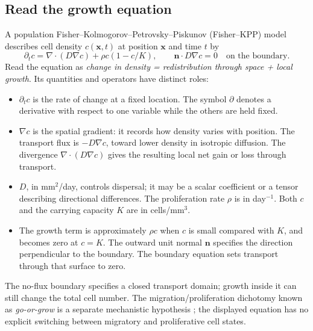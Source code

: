 \documentclass[11pt,a4paper]{article}
\begin{document}
\subsection{Read the growth equation}
A population Fisher--Kolmogorov--Petrovsky--Piskunov (Fisher--KPP) model describes cell density $c(\mathbf{x},t)$ at position $\mathbf{x}$ and time $t$ by
\begin{equation}
\partial_t c=\nabla\!\cdot(D\nabla c)+\rho c(1-c/K),
\qquad \mathbf{n}\!\cdot D\nabla c=0\quad\text{on the boundary}.
\end{equation}
Read the equation as \emph{change in density = redistribution through space + local growth}. Its quantities and operators have distinct roles:
\begin{itemize}
\item $\partial_t c$ is the rate of change at a fixed location. The symbol $\partial$ denotes a derivative with respect to one variable while the others are held fixed.
\item $\nabla c$ is the spatial gradient: it records how density varies with position. The transport flux is $-D\nabla c$, toward lower density in isotropic diffusion. The divergence $\nabla\!\cdot(D\nabla c)$ gives the resulting local net gain or loss through transport.
\item $D$, in mm$^2$/day, controls dispersal; it may be a scalar coefficient or a tensor describing directional differences. The proliferation rate $\rho$ is in day$^{-1}$. Both $c$ and the carrying capacity $K$ are in cells/mm$^3$.
\item The growth term is approximately $\rho c$ when $c$ is small compared with $K$, and becomes zero at $c=K$. The outward unit normal $\mathbf{n}$ specifies the direction perpendicular to the boundary. The boundary equation sets transport through that surface to zero.
\end{itemize}
The no-flux boundary specifies a closed transport domain; growth inside it can still change the total cell number. The migration/proliferation dichotomy known as \emph{go-or-grow} is a separate mechanistic hypothesis \citep{hatzikirou2012}; the displayed equation has no explicit switching between migratory and proliferative cell states.
\end{document}
